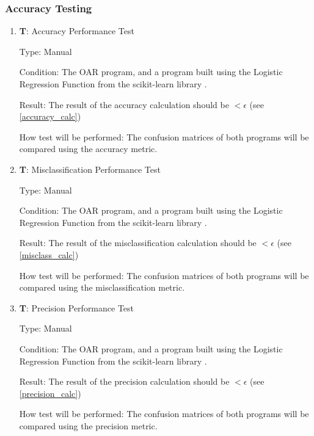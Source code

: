 \documentclass[12pt, titlepage]{article}
\newcounter{testnum} %
\begin{document}
\subsubsection{Accuracy Testing}

\begin{enumerate}

  \item{\textbf{T\thetestnum \label{T_accuracy}}: Accuracy Performance Test\\}

  Type: Manual
            
  Condition: The OAR program, and a program built
  using the Logistic Regression Function from the scikit-learn library \citep{SKLearn}.
            
  Result: The result of the accuracy calculation should be $ < \epsilon$ (see \ref{accuracy_calc})
            
  How test will be performed: The confusion matrices of both programs will be compared using the accuracy metric.

  \item{\textbf{T\thetestnum \label{T_misclass}}: Misclassification Performance Test\\}

  Type: Manual
            
  Condition: The OAR program, and a program built
  using the Logistic Regression Function from the scikit-learn library \citep{SKLearn}.
            
  Result: The result of the misclassification calculation should be $ < \epsilon$ (see \ref{misclass_calc})
            
  How test will be performed: The confusion matrices of both programs will be compared using the misclassification metric.

  \item{\textbf{T\thetestnum \label{T_precision}}: Precision Performance Test\\}

  Type: Manual
            
  Condition: The OAR program, and a program built
  using the Logistic Regression Function from the scikit-learn library \citep{SKLearn}.
            
  Result: The result of the precision calculation should be $ < \epsilon$ (see \ref{precision_calc})
            
  How test will be performed: The confusion matrices of both programs will be compared using the precision metric.
\end{enumerate} 
					
\end{document}
